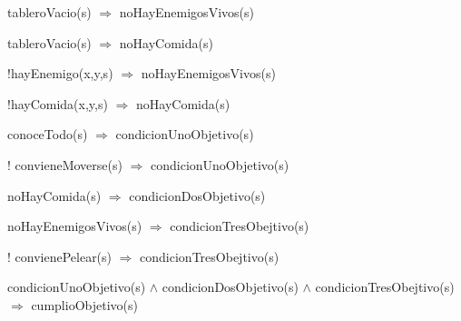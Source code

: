 \begin{itemize}
{\item tableroVacio(s) $\Rightarrow$ noHayEnemigosVivos(s) 
\item tableroVacio(s) $\Rightarrow$ noHayComida(s)
}

\item !hayEnemigo(x,y,s) $\Rightarrow$ noHayEnemigosVivos(s) 
\item !hayComida(x,y,s) $\Rightarrow$ noHayComida(s)
 
\item conoceTodo(s) $\Rightarrow$ condicionUnoObjetivo(s)
\item ! convieneMoverse(s) $\Rightarrow$ condicionUnoObjetivo(s)
\item noHayComida(s) $\Rightarrow$ condicionDosObjetivo(s)
\item noHayEnemigosVivos(s) $\Rightarrow$ condicionTresObejtivo(s)
\item ! convienePelear(s) $\Rightarrow$ condicionTresObejtivo(s)

\item  condicionUnoObjetivo(s) $\land$ condicionDosObjetivo(s)
$\land$ condicionTresObejtivo(s) $\Rightarrow$ cumplioObjetivo(s)

\end{itemize}


